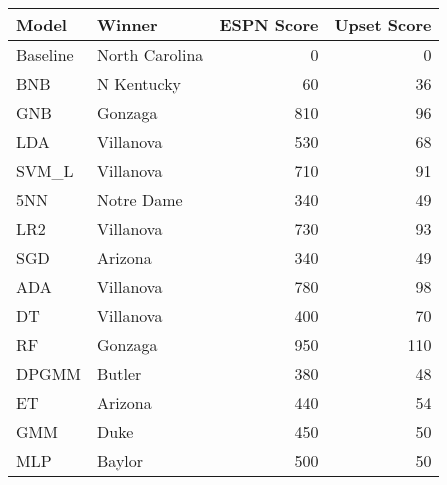 \begin{tabular}{llrr}
\toprule
    Model &          Winner &  ESPN Score &  Upset Score \\
\midrule
 Baseline &  North Carolina &           0 &            0 \\
      BNB &      N Kentucky &          60 &           36 \\
      GNB &         Gonzaga &         810 &           96 \\
      LDA &       Villanova &         530 &           68 \\
    SVM\_L &       Villanova &         710 &           91 \\
      5NN &      Notre Dame &         340 &           49 \\
      LR2 &       Villanova &         730 &           93 \\
      SGD &         Arizona &         340 &           49 \\
      ADA &       Villanova &         780 &           98 \\
       DT &       Villanova &         400 &           70 \\
       RF &         Gonzaga &         950 &          110 \\
    DPGMM &          Butler &         380 &           48 \\
       ET &         Arizona &         440 &           54 \\
      GMM &            Duke &         450 &           50 \\
      MLP &          Baylor &         500 &           50 \\
\bottomrule
\end{tabular}
